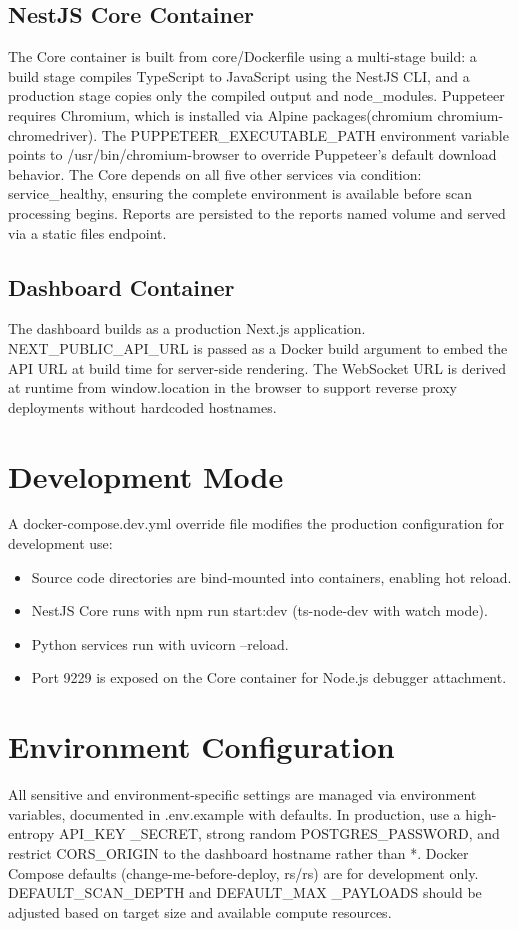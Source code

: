 \subsection{NestJS Core Container}
The Core container is built from core/Dockerfile using a multi-stage build: a build stage compiles TypeScript to JavaScript using the NestJS CLI, and a production stage copies only the compiled output and node\_\allowbreak modules. Puppeteer requires Chromium, which is installed via Alpine packages(chromium chromium-chromedriver). The PUPPETEER\_\allowbreak EXECUTABLE\_\allowbreak PATH environment variable points to /usr/bin/chromium-browser to override Puppeteer's default download behavior. The Core depends on all five other services via condition: service\_\allowbreak healthy, ensuring the complete environment is available before scan processing begins. Reports are persisted to the reports named volume and served via a static files endpoint.
\subsection{ Dashboard Container}
The dashboard builds as a production Next.js application. NEXT\_\allowbreak PUBLIC\_\allowbreak API\_\allowbreak URL is passed as a Docker build argument to embed the API URL at build time for server-side rendering. The WebSocket URL is derived at runtime from window.location in the browser to support reverse proxy deployments without hardcoded hostnames.
\section{Development Mode}
A docker-compose.dev.yml override file modifies the production configuration for development use:
\begin{itemize}[itemsep=2pt, topsep=-15pt]
    \item Source code directories are bind-mounted into containers, enabling hot reload.
    \item NestJS Core runs with npm run start:dev (ts-node-dev with watch mode).
    \item Python services run with uvicorn --reload.
    \item Port 9229 is exposed on the Core container for Node.js debugger attachment.
\end{itemize}

\section{Environment Configuration}
All sensitive and environment-specific settings are managed via environment variables, documented in .env.example with defaults. In production, use a high-entropy API\_\allowbreak KEY \_\allowbreak SECRET, strong random POSTGRES\_\allowbreak PASSWORD, and restrict CORS\_\allowbreak ORIGIN to the dashboard hostname rather than *. Docker Compose defaults (change-me-before-deploy, rs/rs) are for development only. DEFAULT\_\allowbreak SCAN\_\allowbreak DEPTH and DEFAULT\_\allowbreak MAX \_\allowbreak PAYLOADS should be adjusted based on target size and available compute resources.
